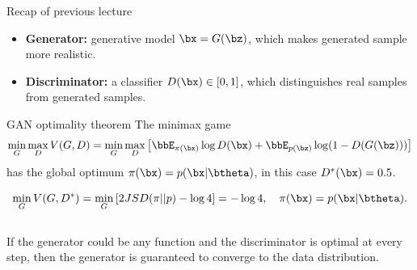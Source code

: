 \begin{frame}{Recap of previous lecture}
	\begin{itemize}
		\item \textbf{Generator:} generative model $\bx = G(\bz)$, which makes generated sample more realistic.
		\item \textbf{Discriminator:} a classifier $D(\bx) \in [0, 1]$, which distinguishes real samples from generated samples.
	\end{itemize}
	
	\begin{block}{GAN optimality theorem}
		The minimax game 
		\vspace{-0.2cm}
		\[
			\min_{G} \max_D V(G, D) = \min_{G} \max_D \left[ \bbE_{\pi(\bx)} \log D(\bx) + \bbE_{p(\bz)} \log (1 - D(G(\bz))) \right]
		\]
		 has the global optimum $\pi(\bx) = p(\bx | \btheta)$, in this case $D^*(\bx) = 0.5$.
	\end{block}
	\vspace{-0.5cm}
	\[
		\min_{G} V(G, D^*) = \min_{G} \left[ 2 JSD(\pi || p) - \log 4 \right] = -\log 4, \quad \pi(\bx) = p(\bx | \btheta).
	\]
	\vspace{-0.4cm} \\
	If the generator could be any function and the discriminator is optimal at every step, then the generator is guaranteed to converge to the data distribution.
\end{frame}
